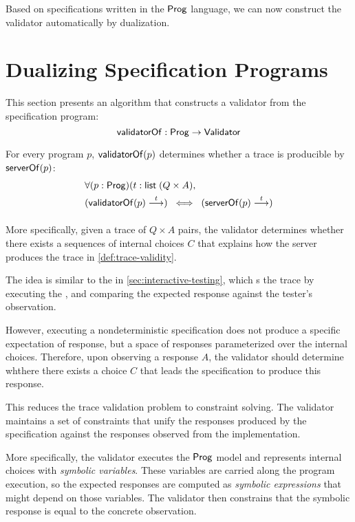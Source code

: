 Based on specifications written in the $\mathsf{Prog}$ language, we can now construct
the validator automatically by dualization.

\section{Dualizing Specification Programs}
\label{sec:dualize-prog}
This section presents an algorithm that constructs a validator from the
specification program:
\[\mathsf{validatorOf}:\mathsf{Prog}\to\mathsf{Validator}\]

For every program $p$, $\mathsf{validatorOf}(p)$ determines whether a trace is
producible by $\mathsf{serverOf}(p)$:
\begin{align*}
  &\forall (p:\Prog)(t:\List(Q\times A),\\
  &(\behaves{\validatorOf(p)}t)\;\iff\;(\behaves{\serverOf(p)}t)
\end{align*}

More specifically, given a trace of $Q\times A$ pairs, the validator determines
whether there exists a sequences of internal choices $C$ that explains how the
server produces the trace in \autoref{def:trace-validity}.

The idea is similar to the  in \autoref{sec:interactive-testing},
which s the trace by executing the , and comparing
the expected response against the tester's observation.

However, executing a nondeterministic specification does not produce a specific
expectation of response, but a space of responses parameterized over the
internal choices.  Therefore, upon observing a response $A$, the validator
should determine whthere there exists a choice $C$ that leads the specification
to produce this response.

This reduces the trace validation problem to constraint solving.  The validator
maintains a set of constraints that unify the responses produced by the
specification against the responses observed from the implementation.

More specifically, the validator executes the $\mathsf{Prog}$ model and represents
internal choices with {\em symbolic variables}.  These variables are carried
along the program execution, so the expected responses are computed as {\em
  symbolic expressions} that might depend on those variables.  The validator
then constrains that the symbolic response is equal to the concrete observation.

